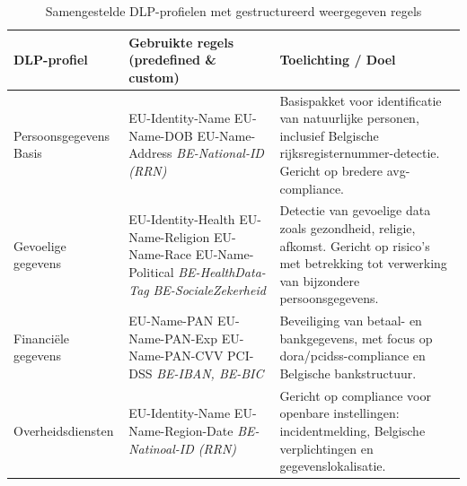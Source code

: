 \begin{table}[H]
    \centering
    \small
    \scriptsize
    \begin{tabular}{p{3cm}p{5cm}p{6cm}}
        \toprule
        \textbf{DLP-profiel} & \textbf{Gebruikte regels (predefined \& custom)} & \textbf{Toelichting / Doel} \\
        \midrule
        Persoonsgegevens Basis &
        EU-Identity-Name \newline
        EU-Name-DOB \newline
        EU-Name-Address \newline
        \textit{BE-National-ID (RRN)} &
        Basispakket voor identificatie van natuurlijke personen, inclusief Belgische rijksregisternummer-detectie. Gericht op bredere \gls{avg}-compliance. \\
        
        Gevoelige gegevens &
        EU-Identity-Health \newline
        EU-Name-Religion \newline
        EU-Name-Race \newline
        EU-Name-Political \newline
        \textit{BE-HealthData-Tag} \newline
        \textit{BE-SocialeZekerheid} &
        Detectie van gevoelige data zoals gezondheid, religie, afkomst. Gericht op risico’s met betrekking tot verwerking van bijzondere persoonsgegevens. \\
        
        Financiële gegevens &
        EU-Name-PAN \newline
        EU-Name-PAN-Exp \newline
        EU-Name-PAN-CVV \newline
        PCI-DSS \newline
        \textit{BE-IBAN, BE-BIC} &
        Beveiliging van betaal- en bankgegevens, met focus op \gls{dora}/\gls{pcidss}-compliance en Belgische bankstructuur. \\
        
        Overheidsdiensten &
        EU-Identity-Name \newline
        EU-Name-Region-Date \newline
        \textit{BE-Natinoal-ID (RRN)} &
        Gericht op compliance voor openbare instellingen: incidentmelding, Belgische verplichtingen en gegevenslokalisatie. \\
        \bottomrule
    \end{tabular}
    \caption{Samengestelde DLP-profielen met gestructureerd weergegeven regels}
    \label{tab:custom-dlp-profielen}
\end{table}


